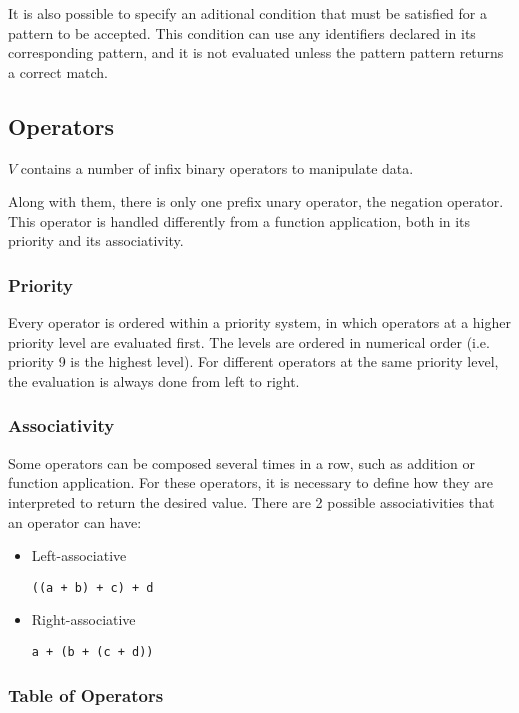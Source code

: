 \documentclass{article}
\def\code#1{\begin{footnotesize}\texttt{#1}\end{footnotesize}}
\begin{document}
It is also possible to specify an aditional condition that must be satisfied for a pattern to be accepted.
This condition can use any identifiers declared in its corresponding pattern, and it is not evaluated unless the pattern pattern returns a correct match.

\subsection{Operators}

$V$ contains a number of infix binary operators to manipulate data.

Along with them, there is only one prefix unary operator, the negation operator.
This operator is handled differently from a function application, both in its priority and its associativity.

\subsubsection{Priority}

Every operator is ordered within a priority system, in which operators at a higher priority level are evaluated first.
The levels are ordered in numerical order (i.e. priority 9 is the highest level).
For different operators at the same priority level, the evaluation is always done from left to right.

\subsubsection{Associativity}

Some operators can be composed several times in a row, such as addition or function application.
For these operators, it is necessary to define how they are interpreted to return the desired value.
There are 2 possible associativities that an operator can have:

\begin{itemize}
  \item Left-associative \\
    \code{((a + b) + c) + d}
  \item Right-associative \\
    \code{a + (b + (c + d))}
\end{itemize}

\subsubsection{Table of Operators}
\end{document}
